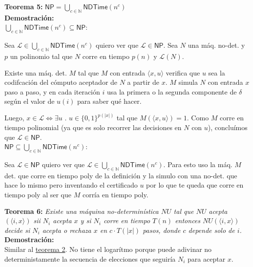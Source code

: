 \documentclass{article}
\begin{document}
\begin{flushleft}
  \textbf{Teorema 5:}
  $\mathsf{NP} = \bigcup_{c \in \mathbb{N}} \mathsf{NDTime}(n^c)$ \\[0.5 em]

  \textbf{\textcolor{Mulberry}{Demostración:}} \\[0.5em]

  \textcolor{Mulberry}{$\bigcup_{c \in \mathbb{N}} \mathsf{NDTime}(n^c) \subseteq \mathsf{NP}$:}

  Sea $\mathcal{L} \in \bigcup_{c \in \mathbb{N}} \mathsf{NDTime}(n^c)$ quiero ver que $\mathcal{L} \in 
  \mathsf{NP}$.
  Sea $N$ una máq. no-det. y $p$ un polinomio tal que $N$ corre en tiempo $p(n)$ y $\mathcal{L}(N)$.

  Existe una máq. det. $M$ tal que $M$ con entrada $\langle x,u \rangle$ verifica que $u$ sea la 
  codifcación del cómputo aceptador de $N$ a partir de $x$. 
  $M$ simula $N$ con entrada $x$ paso a paso, y en cada iteración $i$ usa la primera o la segunda 
  componente de $\delta$ según el valor de $u(i)$ para saber qué hacer.

  Luego, $x \in \mathcal{L} \iff \exists u$ . $u \in  \{ 0,1 \}^{p(|x|)}$ tal que $M(\langle x,u \rangle)
  = 1$. Como $M$ corre en tiempo polinomial (ya que es solo recorrer las decisiones en $N$ con $u$), 
  concluímos que $\mathcal{L} \in \mathsf{NP}$.\\[0.5em]

  \textcolor{Mulberry}{$\mathsf{NP} \subseteq \bigcup_{c \in \mathbb{N}} \mathsf{NDTime}(n^c)$:}

  Sea $\mathcal{L} \in \mathsf{NP}$ quiero ver que $\mathcal{L} \in \bigcup_{c \in \mathbb{N}} 
  \mathsf{NDTime}(n^c)$. Para esto uso la máq. $M$ det. que corre en tiempo poly de la definición y la 
  simulo con una no-det. que hace lo mismo pero inventando el certificado $u$ por lo que te queda que corre
  en tiempo poly al ser que $M$ corría en tiempo poly.
\end{flushleft}

\begin{flushleft}
  \textbf{Teorema 6:}
  \textit{Existe una máquina no-determinística $NU$ tal que $NU$ acepta $(\langle i,x \rangle)$ sii $N_i$
  acepta $x$ y si $N_i$ corre en tiempo $T(n)$ entonces $NU(\langle i,x \rangle)$ decide si $N_i$ acepta o 
  rechaza $x$ en $c \cdot T(|x|)$ pasos, donde $c$ depende solo de $i$.} \\[0.5em]

  \textbf{\textcolor{Mulberry}{Demostración:}} \\[0.5em]

  Similar al \hyperlink{teo2}{\textcolor{Rhodamine}{teorema 2}}. No tiene el logarítmo porque puede 
  adivinar no deterministamente la secuencia de elecciones que  seguiría $N_i$ para aceptar $x$.
\end{flushleft}
\end{document}
